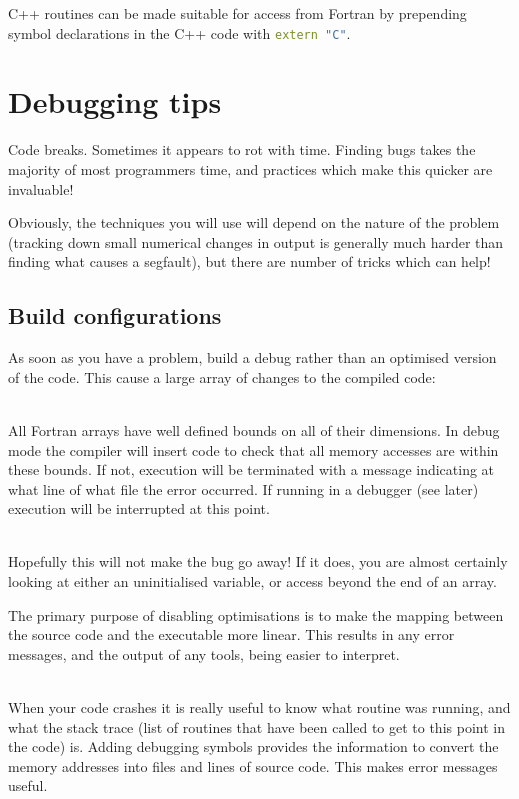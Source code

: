 \documentclass[a4paper,notitlepage]{scrreprt}
\newcommand\headitem[1]{\needspace{1.5\baselineskip}\item[{\boldmath #1 \nopagebreak}] \hfill \\ \nopagebreak}
\let\code\lstinline
\begin{document}
{{{C++ routines can be made suitable for access from Fortran by prepending symbol
declarations in the C++ code with \code[language=C++]{extern "C"}.

\section{Debugging tips}
Code breaks. Sometimes it appears to rot with time. Finding bugs takes the
majority of most programmers time, and practices which make this quicker are
invaluable!

Obviously, the techniques you will use will depend on the nature of the
problem (tracking down small numerical changes in output is generally much
harder than finding what causes a segfault), but there are number of tricks
which can help!

\subsection{Build configurations}
As soon as you have a problem, build a debug rather than an optimised version
of the code. This cause a large array of changes to the compiled code:
\begin{description}
	\headitem{Array bounds checking}
		All Fortran arrays have well defined bounds on all of their dimensions.
		In debug mode the compiler will insert code to check that all memory
		accesses are within these bounds. If not, execution will be terminated
		with a message indicating at what line of what file the error occurred.
		If running in a debugger (see later) execution will be interrupted at
		this point.

	\headitem{Disable optimisations}
		Hopefully this will not make the bug go away! If it does, you are
		almost certainly looking at either an uninitialised variable, or access
		beyond the end of an array.

		The primary purpose of disabling optimisations is to make the mapping
		between the source code and the executable more linear. This results
		in any error messages, and the output of any tools, being easier to
		interpret.

	\headitem{Adds debugging symbols}
		When your code crashes it is really useful to know what routine was
		running, and what the stack trace (list of routines that have been
		called to get to this point in the code) is. Adding debugging symbols
		provides the information to convert the memory addresses into files
		and lines of source code. This makes error messages useful.		


\end{description}}}}
\end{document}
